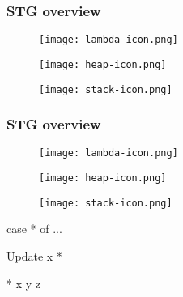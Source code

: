 \documentclass[bigger,aspectratio=169]{beamer}
\begin{document}
\begin{frame}[fragile]
\frametitle{STG overview}
\begin{center}

	\begin{minipage}{0.25\textwidth}
		\begin{figure}
			\texttt{[image: lambda-icon.png]}
		\end{figure}
	\end{minipage}
	\hfill
	\begin{minipage}{0.30\textwidth}
		\begin{figure}
			\texttt{[image: heap-icon.png]}
		\end{figure}
	\end{minipage}
	\hfill
	\begin{minipage}{0.30\textwidth}
		\begin{figure}
			\texttt{[image: stack-icon.png]}
		\end{figure}
	\end{minipage}

\end{center}
\end{frame}

\begin{frame}[fragile]
\frametitle{STG overview}
\begin{center}

	\begin{minipage}{0.25\textwidth}
		\begin{figure}
			\texttt{[image: lambda-icon.png]}
		\end{figure}
	\end{minipage}
	\hfill
	\begin{minipage}{0.30\textwidth}
		\begin{figure}
			\texttt{[image: heap-icon.png]}
		\end{figure}
	\end{minipage}
	\hfill
	\begin{minipage}{0.30\textwidth}
		\vspace{1cm}
		\begin{figure}
			\texttt{[image: stack-icon.png]}
		\end{figure}
		\pause
		\begin{haskellcode}
			case * of {...}
		\end{haskellcode}
		\pause
		\begin{haskellcode}
			Update x *
		\end{haskellcode}
		\pause
		\begin{haskellcode}
			* x y z
		\end{haskellcode}
	\end{minipage}

\end{center}
\end{frame}
\end{document}

